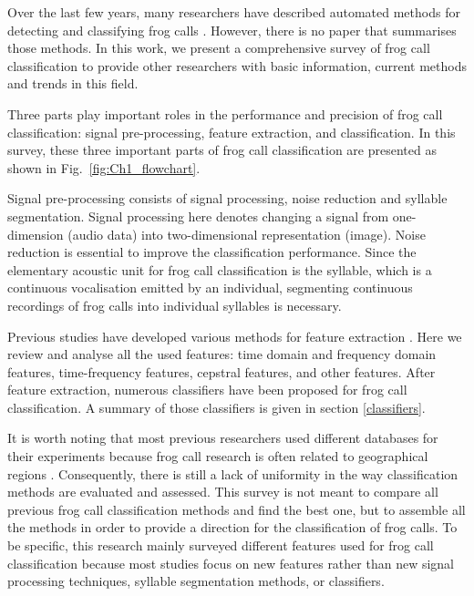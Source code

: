 Over the last few years, many researchers have described automated methods for detecting and classifying frog calls \citep{huang2008realization, huang2009frog, han2011acoustic,chen2012automatic, Gingras2013, camacho2013automatic, Huang20141}. However, there is no paper that summarises those methods. In this work, we present a comprehensive survey of frog call classification to provide other researchers with basic information, current methods and trends in this field. 

Three parts play important roles in the performance and precision of frog call classification: signal pre-processing, feature extraction, and classification. In this survey, these three important parts of frog call classification are presented as shown in Fig.~\ref{fig:Ch1_flowchart}. 




Signal pre-processing consists of signal processing, noise reduction and syllable segmentation. Signal processing here denotes changing a signal from one-dimension (audio data) into two-dimensional representation (image). Noise reduction is essential to improve the classification performance. Since the elementary acoustic unit for frog call classification is the syllable, which is a continuous vocalisation emitted by an individual, segmenting continuous recordings of frog calls into individual syllables is necessary. 

Previous studies have developed various methods for feature extraction \citep{huang2008realization, huang2009frog, han2011acoustic, chen2012automatic, Gingras2013, camacho2013automatic, Huang20141}. Here we review and analyse all the used features: time domain and frequency domain features, 
time-frequency features, cepstral features, and other features. After feature extraction, numerous classifiers have been proposed for frog call classification. A summary of those classifiers is given in section \ref{classifiers}.


It is worth noting that most previous researchers used different databases for their experiments because frog call research is often related to geographical regions \citep{jang2011geographic}. Consequently, there is still a lack of uniformity in the way classification methods are evaluated and assessed. This survey is not meant to compare all previous frog call classification methods and find the best one, but to assemble all the methods in order to provide a direction for the classification of frog calls. To be specific, this research mainly surveyed different features used for frog call classification because most studies focus on new features rather than new signal processing techniques, syllable segmentation methods, or classifiers.

